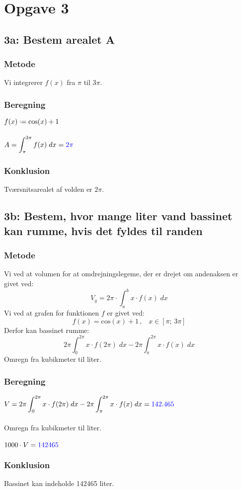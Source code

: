 \documentclass[../main.tex]{subfiles}
\begin{document}
\section*{Opgave 3}
    \subsection*{3a: Bestem arealet A}
        \subsubsection*{Metode}
            Vi integrerer \(f(x)\) fra \(\pi\) til \(3\pi\).
        \subsubsection*{Beregning}
            \(f(x) \defeq \text{cos}(x)+1\)\\\\
            \(\displaystyle A = \int_\pi ^{3\pi} f(x) \; dx = \textcolor{blue}{2\pi}\)\\
        \subsubsection*{Konklusion}
            Tværsnitsarealet af volden er \(2\pi\).

\clearpage
    \subsection*{3b: Bestem, hvor mange liter vand bassinet kan rumme, hvis det fyldes til randen}
        \subsubsection*{Metode}
            Vi ved at volumen for at omdrejningslegeme, der er drejet om andenaksen er givet ved:
            \[V_y=2\pi \cdot \int _a ^b x\cdot f(x)\; dx\]
            Vi ved at grafen for funktionen \(f\) er givet ved:
            \[f(x)=\text{cos}(x)+1\, , \;\;\; x \in [\pi;\,3\pi]\]
            Derfor kan bassinet rumme:
            \[2\pi\int _0 ^{2\pi}x\cdot f(2\pi)\; dx-2\pi \int _\pi ^{2\pi} x\cdot f(x)\; dx\]
            Omregn fra kubikmeter til liter.
        \subsubsection*{Beregning}
            \(\displaystyle V=2\pi\int _0 ^{2\pi}x\cdot f(2\pi)\; dx-2\pi \int _\pi ^{2\pi} x\cdot f(x)\; dx=\textcolor{blue}{142.465}\)\\\\
            Omregn fra kubikmeter til liter.\\\\
            \(1000 \cdot V = \textcolor{blue}{142465}\)
        \subsubsection*{Konklusion}
            Bassinet kan indeholde 142465 liter.
\end{document}
